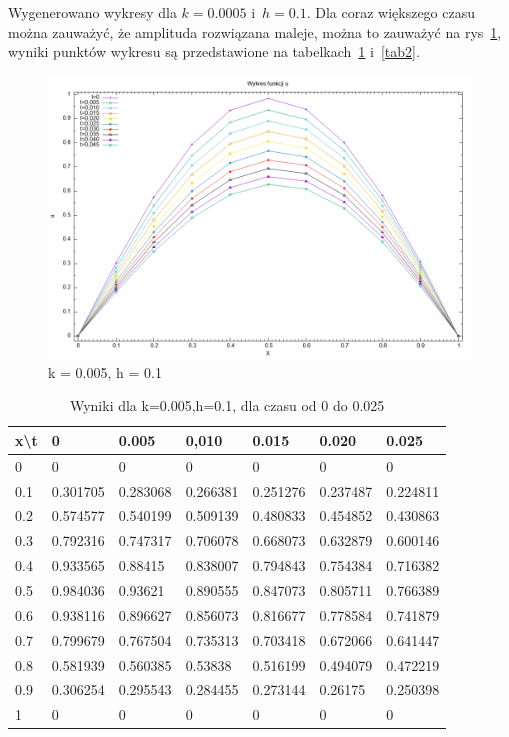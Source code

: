 \documentclass[a4paper,12pt]{article}
\begin{document}
	Wygenerowano wykresy dla $k=0.0005$ i~$h=0.1$. Dla coraz większego czasu można zauważyć, że amplituda rozwiązana maleje, można to zauważyć na rys~\ref{fig:wykresy-dla-uxt}, wyniki punktów wykresu są przedstawione na tabelkach~\ref{tab1} i~\ref{tab2}.\\
	\begin{figure}
		\centering
		\includegraphics[width=0.7\linewidth]{rys/wykresy dla u(x,t).png}
		\caption{k = 0.005, h = 0.1}
		\label{fig:wykresy-dla-uxt}
	\end{figure}
	\begin{table}[]
		\begin{tabular}{|l|l|l|l|l|l|l|}
			\hline
			x\textbackslash{}t & 0        & 0.005    & 0,010    & 0.015    & 0.020    & 0.025    \\ \hline
			0                  & 0        & 0        & 0        & 0        & 0        & 0        \\ \hline
			0.1                & 0.301705 & 0.283068 & 0.266381 & 0.251276 & 0.237487 & 0.224811 \\ \hline
			0.2                & 0.574577 & 0.540199 & 0.509139 & 0.480833 & 0.454852 & 0.430863 \\ \hline
			0.3                & 0.792316 & 0.747317 & 0.706078 & 0.668073 & 0.632879 & 0.600146 \\ \hline
			0.4                & 0.933565 & 0.88415  & 0.838007 & 0.794843 & 0.754384 & 0.716382 \\ \hline
			0.5                & 0.984036 & 0.93621  & 0.890555 & 0.847073 & 0.805711 & 0.766389 \\ \hline
			0.6                & 0.938116 & 0.896627 & 0.856073 & 0.816677 & 0.778584 & 0.741879 \\ \hline
			0.7                & 0.799679 & 0.767504 & 0.735313 & 0.703418 & 0.672066 & 0.641447 \\ \hline
			0.8                & 0.581939 & 0.560385 & 0.53838  & 0.516199 & 0.494079 & 0.472219 \\ \hline
			0.9                & 0.306254 & 0.295543 & 0.284455 & 0.273144 & 0.26175  & 0.250398 \\ \hline
			1                  & 0        & 0        & 0        & 0        & 0        & 0        \\ \hline\end{tabular}
		\caption{Wyniki dla k=0.005,h=0.1, dla czasu od 0 do 0.025}
		\label{tab1}
	\end{table}
\end{document}
